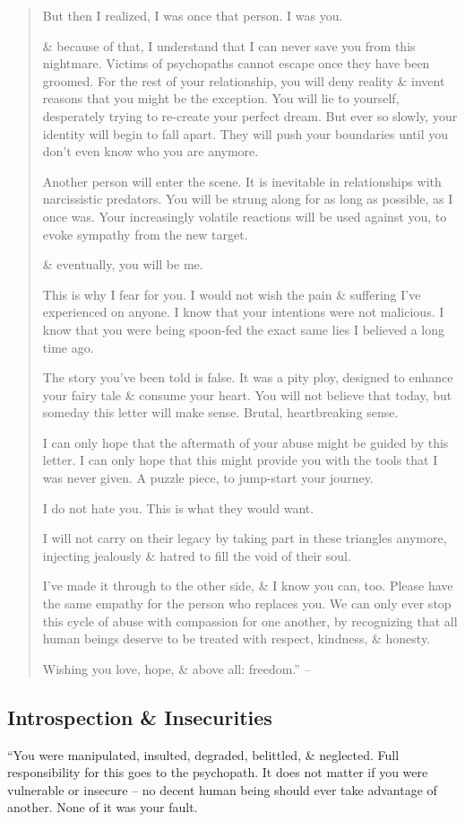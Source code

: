 \documentclass{article}
\numberwithin{equation}{section}
\begin{document}
\begin{quote}
	But then I realized, I was once that person. I was you.
	
	\& because of that, I understand that I can never save you from this nightmare. Victims of psychopaths cannot escape once they have been groomed. For the rest of your relationship, you will deny reality \& invent reasons that you might be the exception. You will lie to yourself, desperately trying to re-create your perfect dream. But ever so slowly, your identity will begin to fall apart. They will push your boundaries until you don't even know who you are anymore.
	
	Another person will enter the scene. It is inevitable in relationships with narcissistic predators. You will be strung along for as long as possible, as I once was. Your increasingly volatile reactions will be used against you, to evoke sympathy from the new target.
	
	\& eventually, you will be me.
	
	This is why I fear for you. I would not wish the pain \& suffering I've experienced on anyone. I know that your intentions were not malicious. I know that you were being spoon-fed the exact same lies I believed a long time ago.
	
	The story you've been told is false. It was a pity ploy, designed to enhance your fairy tale \& consume your heart. You will not believe that today, but someday this letter will make sense. Brutal, heartbreaking sense.
	
	I can only hope that the aftermath of your abuse might be guided by this letter. I can only hope that this might provide you with the tools that I was never given. A puzzle piece, to jump-start your journey.
	
	I do not hate you. This is what they would want.
	
	I will not carry on their legacy by taking part in these triangles anymore, injecting jealously \& hatred to fill the void of their soul.
	
	I've made it through to the other side, \& I know you can, too. Please have the same empathy for the person who replaces you. We can only ever stop this cycle of abuse with compassion for one another, by recognizing that all human beings deserve to be treated with respect, kindness, \& honesty.
	
	Wishing you love, hope, \& above all: freedom.'' -- {\rm\cite[pp. 145--147]{MacKenzie2015}}
\end{quote}

\subsection{Introspection \& Insecurities}
``You were manipulated, insulted, degraded, belittled, \& neglected. Full responsibility for this goes to the psychopath. It does not matter if you were vulnerable or insecure -- no decent human being should ever take advantage of another. None of it was your fault.
\end{document}
